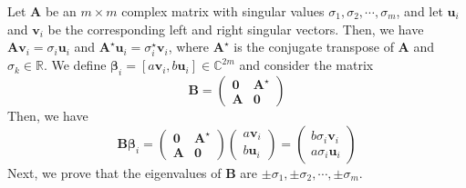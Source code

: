 \documentclass{article}
\begin{document}
Let $\bm{A}$ be an $m \times m$ complex matrix with singular values $\sigma_1, \sigma_2, \cdots, \sigma_m$, and let $\bm{u}_i$ and $\bm{v}_i$ be the corresponding left and right singular vectors. Then, we have $\bm{A}\bm{v}_i = \sigma_i \bm{u}_i$ and $\bm{A}^{\star} \bm{u}_i = \sigma_i^{\star}\bm{v}_i$, where $\bm{A}^\star$ is the conjugate transpose of $\bm{A}$ and $\sigma_k \in \mathbb{R}$. We define $\bm{\beta}_i = [a\bm{v}_i, b\bm{u}_i] \in \mathbb{C}^{2m}$ and consider the matrix
$$
\bm{B} = \begin{pmatrix}
    \bm{0} & \bm{A}^\star \\
\bm{A} & \bm{0}
\end{pmatrix}
$$
Then, we have 
$$
\bm{B} \bm{\beta}_i = \begin{pmatrix}
\bm{0} & \bm{A}^\star \\
\bm{A} & \bm{0}
\end{pmatrix} \begin{pmatrix}
a  \bm{v}_i\\
b  \bm{u}_i
\end{pmatrix} =  \begin{pmatrix}
b \sigma_i \bm{v}_i\\
a \sigma_i \bm{u}_i
\end{pmatrix}
$$
Next, we prove that the eigenvalues of $\bm{B}$ are $\pm\sigma_1, \pm \sigma_2, \cdots, \pm \sigma_m$.
\end{document}
